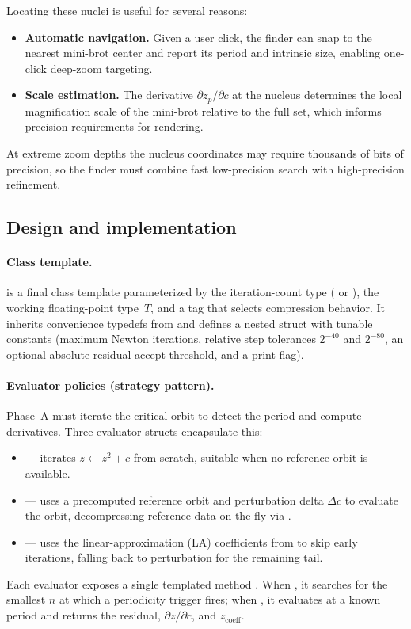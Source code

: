Locating these nuclei is useful for several reasons:
\begin{itemize}
\item \textbf{Automatic navigation.}  Given a user click, the finder can snap
  to the nearest mini-brot center and report its period and intrinsic size,
  enabling one-click deep-zoom targeting.
\item \textbf{Scale estimation.}  The derivative $\partial z_p/\partial c$ at
  the nucleus determines the local magnification scale of the mini-brot
  relative to the full set, which informs precision requirements for rendering.
\end{itemize}
At extreme zoom depths the nucleus coordinates may require thousands of bits of
precision, so the finder must combine fast low-precision search with
high-precision refinement.

\subsection{Design and implementation}
\label{subsec:ff-design}

\paragraph{Class template.}
 is a final class template
parameterized by the iteration-count type ( or
), the working floating-point type~$T$, and a
 tag that selects compression behavior.  It inherits
convenience typedefs from  and defines a nested
 struct with tunable constants (maximum Newton iterations,
relative step tolerances $2^{-40}$ and $2^{-80}$, an optional absolute
residual accept threshold, and a print flag).

\paragraph{Evaluator policies (strategy pattern).}
Phase~A must iterate the critical orbit to detect the period and compute
derivatives.  Three evaluator structs encapsulate this:
\begin{itemize}
\item {} --- iterates $z\leftarrow z^2+c$ from scratch,
  suitable when no reference orbit is available.
\item {} --- uses a precomputed reference orbit and
  perturbation delta $\Delta c$ to evaluate the orbit, decompressing
  reference data on the fly via .
\item {} --- uses the linear-approximation (LA) coefficients
  from  to skip early iterations, falling back to
  perturbation for the remaining tail.
\end{itemize}
Each evaluator exposes a single templated method .
When , it searches for the smallest $n$ at which a
periodicity trigger fires; when , it evaluates at a
known period and returns the residual, $\partial z/\partial c$, and
$z_{\mathrm{coeff}}$.

